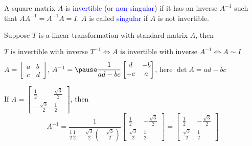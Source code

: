 \documentclass{beamer}
\theoremstyle{definition}
\theoremstyle{remark}
\begin{document}
\begin{frame}[t]
\begin{definition}
A square matrix $A$ is \textcolor{blue}{invertible} (or \textcolor{blue}{non-singular}) if it has an inverse $A^{-1}$ such that $AA^{-1}=A^{-1}A=I$\pause. $A$ is called \textcolor{blue}{singular} if $A$ is not invertible.
\end{definition}

\begin{theorem}
Suppose $T$ is a linear transformation with standard matrix $A$, then\pause

$T\text{ is invertible with inverse }T^{-1}\iff A\text{ is invertible with inverse }A^{-1}\iff A\sim I$
\end{theorem}
\end{frame}

\begin{frame}[t]
\begin{theorem}
$A=\begin{bmatrix}
a&b\\c&d
\end{bmatrix}$, $A^{-1}=\pause\dfrac{1}{ad-bc}\begin{bmatrix}
d&-b\\-c&a
\end{bmatrix}$, here $\det A=ad-bc$
\end{theorem}

\begin{example}
If $A=\begin{bmatrix}
\frac{1}{2}&\frac{\sqrt{3}}{2}\\-\frac{\sqrt{3}}{2}&\frac{1}{2}
\end{bmatrix}$, then
\[
A^{-1}=\dfrac{1}{\frac{1}{2}\frac{1}{2}-\frac{\sqrt{3}}{2}\left(-\frac{\sqrt{3}}{2}\right)}\begin{bmatrix}
\frac{1}{2}&-\frac{\sqrt{3}}{2}\\\frac{\sqrt{3}}{2}&\frac{1}{2}
\end{bmatrix}=\begin{bmatrix}
\frac{1}{2}&-\frac{\sqrt{3}}{2}\\\frac{\sqrt{3}}{2}&\frac{1}{2}
\end{bmatrix}
\]
\end{example}
\end{frame}
\end{document}
